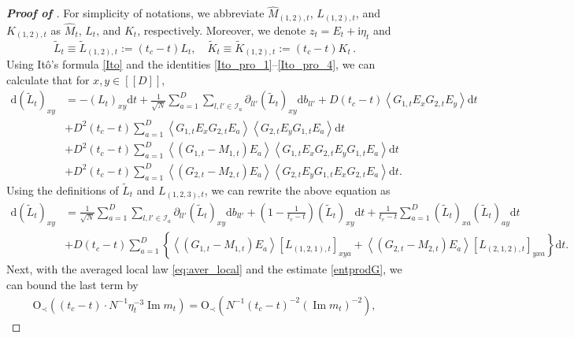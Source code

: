 \documentclass[10pt,reqno]{amsart}
\numberwithin{equation}{section}
\numberwithin{figure}{section}
\theoremstyle{plain} %
\theoremstyle{definition} %
\newcommand{\wh}{\widehat}
\newcommand{\wt}{\widetilde}
\newcommand{\ii}{\mathrm{i}}
\newcommand{\dd}{\mathrm{d}}
\newcommand{\qq}[1]{[\![{#1}]\!]}
\newcommand{\pa}[1]{\left({#1}\right)}
\DeclareMathOperator{\im}{\mathrm{Im}}
\newcommand{\be}{\begin{equation}}
\newcommand{\ee}{\end{equation}}
\newcommand{\OO}{\mathrm{O}}
\newcommand{\kk}{l'}
\numberwithin{equation}{section}
\begin{document}
\begin{proof}[\bf Proof of ]
    For simplicity of notations, we abbreviate $\wh M_{(1,2),t}$, $L_{(1,2),t}$, and $K_{(1,2),t}$ as $\wh M_{t}$, $L_t$, and $K_t$, respectively. Moreover, we denote $z_t=E_t+\ii \eta_t$ and
\be\label{eq:wtL12t}
\wt L_t\equiv \wt L_{(1,2),t}:= (t_c-t) L_t, \quad \wt K_t\equiv \wt K_{(1,2),t}:= (t_c-t) K_t \, .
\ee
Using Itô's formula \eqref{Ito} and the identities \eqref{Ito_pro_1}--\eqref{Ito_pro_4}, we can calculate that for $ x,y \in \qq D$, 
\begin{align*}
\dd (\widetilde{L}_{t})_{xy} &= - (L_t)_{xy} \dd t  + \frac{1}{\sqrt{N}} \sum_{a=1}^D \sum_{ l,\kk \in \mathcal{I}_a} \partial_{ l\kk} (\widetilde{L}_{t})_{x y} \dd b_{ l\kk} + D(t_c-t)\left\langle G_{1,t} E_x G_{2,t} E_y\right\rangle \dd t \\
&+ D^2(t_c-t) \sum_{a=1}^D\left\langle G_{1,t} E_x G_{2,t} E_a\right\rangle\left\langle G_{2,t} E_y G_{1,t} E_a\right\rangle \dd t  \\
& + D^2(t_c-t) \sum_{a=1}^D
 \left\langle \left(G_{1,t}-M_{1,t} \right) E_a\right\rangle\left\langle G_{1,t} E_x G_{2,t} E_y G_{1,t} E_a\right\rangle \dd t\\
 & + D^2(t_c-t) \sum_{a=1}^D \left\langle \left(G_{2,t}-M_{2,t} \right) E_a\right\rangle\left\langle G_{2,t} E_y G_{1,t} E_x G_{2,t} E_a\right\rangle \dd t  .
 \end{align*}
 Using the definitions of $\wt L_t$ and $L_{(1,2,3),t}$, we can rewrite the above equation as 
 \begin{align}
\dd (\widetilde{L}_{t})_{xy}&= \frac{1}{\sqrt{N}} \sum_{a=1}^D \sum_{ l,\kk \in \mathcal{I}_a} \partial_{ l\kk} (\widetilde{L}_{t})_{x y} \dd b_{ l\kk} + \left(1 - \frac{1}{t_c-t}\right) (\widetilde{L}_{t})_{x y} \dd t + \frac{1}{t_c-t} \sum_{a=1}^D (\widetilde{L}_{t})_{x a} (\widetilde{L}_{t})_{a y} \dd t  \nonumber\\
&+ D(t_c-t) \sum_{a=1}^D \left\{\left\langle \left(G_{1,t}-M_{1,t} \right) E_a\right\rangle [L_{(1,2,1),t}]_{xya} + \left\langle \left(G_{2,t}-M_{2,t} \right) E_a\right\rangle [L_{(2,1,2),t}]_{yxa} \right\} \dd t . \label{ItowtL}
\end{align}
Next, with the averaged local law \eqref{eq:aver_local} and the estimate \eqref{entprodG}, we can bound the last term by
\begin{equation}\nonumber
    \begin{aligned}
        \OO_\prec\pa{(t_c-t)\cdot N^{-1}\eta_t^{-3}\im m_t}=\OO_\prec\pa{N^{-1}(t_c-t)^{-2}\pa{\im m_t}^{-2}},

\end{aligned}
\end{equation}
\end{proof}
\end{document}
